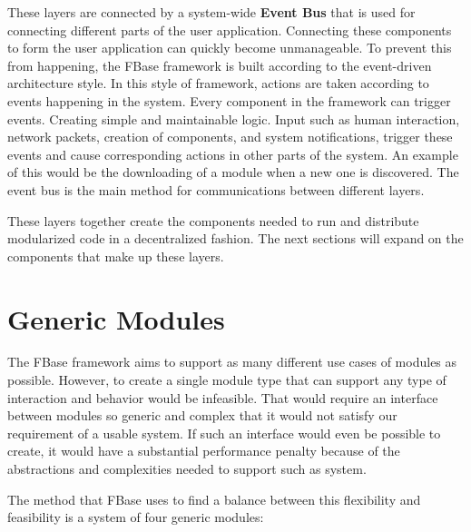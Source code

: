 These layers are connected by a system-wide \textbf{Event Bus} that is used for connecting different parts of the user application. Connecting these components to form the user application can quickly become unmanageable. To prevent this from happening, the FBase framework is built according to the event-driven architecture style. In this style of framework, actions are taken according to events happening in the system. Every component in the framework can trigger events. Creating simple and maintainable logic. Input such as human interaction, network packets, creation of components, and system notifications, trigger these events and cause corresponding actions in other parts of the system. An example of this would be the downloading of a module when a new one is discovered. The event bus is the main method for communications between different layers.

These layers together create the components needed to run and distribute modularized code in a decentralized fashion. The next sections will expand on the components that make up these layers.

\section{Generic Modules}

The FBase framework aims to support as many different use cases of modules as possible. However, to create a single module type that can support any type of interaction and behavior would be infeasible. That would require an interface between modules so generic and complex that it would not satisfy our requirement of a usable system. If such an interface would even be possible to create, it would have a substantial performance penalty because of the abstractions and complexities needed to support such as system.

The method that FBase uses to find a balance between this flexibility and feasibility is a system of four generic modules:

